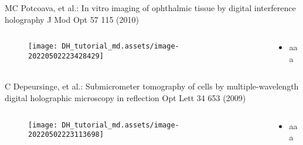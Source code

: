 \documentclass[t, aspectratio=169]{beamer}
\begin{document}
\begin{frame}{MC Potcoava, et al.: In vitro imaging of ophthalmic tissue by digital interference holography}
	\vspace{-3 mm}
	\small J Mod Opt 57 115 (2010)
	\begin{columns}
		\begin{column}{.6\textwidth}
			\begin{figure}
				\texttt{[image: DH\_tutorial\_md.assets/image-20220502223428429]}
			\end{figure}
		\end{column}
		\begin{column}{.4\textwidth}
			\begin{itemize}
				\item aaa
			\end{itemize}
		\end{column}
	\end{columns}
\end{frame}




\begin{frame}{C Depeursinge, et al.: Submicrometer tomography of cells by multiple-wavelength digital holographic microscopy in reflection}
	\vspace{-3 mm}
	\small Opt Lett 34 653 (2009)
	\begin{columns}
		\begin{column}{.6\textwidth}
			\begin{figure}
				\texttt{[image: DH\_tutorial\_md.assets/image-20220502223113698]}
			\end{figure}
		\end{column}
		\begin{column}{.4\textwidth}
			\begin{itemize}
				\item aaa
			\end{itemize}
		\end{column}
	\end{columns}
\end{frame}
\end{document}
